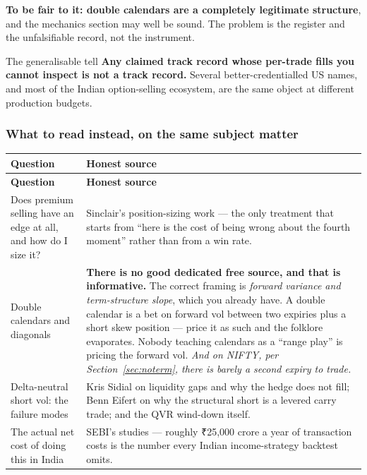 \documentclass[11pt,a4paper]{article}
\newcommand{\rs}{₹}
\begin{document}
\textbf{To be fair to it: double calendars are a completely legitimate structure},
and the mechanics section may well be sound. The problem is the register and the
unfalsifiable record, not the instrument.

\begin{keyfact}{The generalisable tell}
\textbf{Any claimed track record whose per-trade fills you cannot inspect is not a
track record.} Several better-credentialled US names, and most of the Indian
option-selling ecosystem, are the same object at different production budgets.
\end{keyfact}

\subsubsection{What to read instead, on the same subject matter}

{\small
\setlength{\LTpre}{8pt}\setlength{\LTpost}{8pt}
\begin{longtable}{@{}p{4.6cm}p{11.0cm}@{}}
\toprule
\textbf{Question} & \textbf{Honest source} \\
\midrule
\endfirsthead
\toprule
\textbf{Question} & \textbf{Honest source} \\
\midrule
\endhead
\bottomrule
\endlastfoot
Does premium selling have an edge at all, and how do I size it? &
Sinclair's position-sizing work --- the only treatment that starts from ``here is
the cost of being wrong about the fourth moment'' rather than from a win rate. \\[3pt]
Double calendars and diagonals &
\textbf{There is no good dedicated free source, and that is informative.} The
correct framing is \emph{forward variance and term-structure slope}, which you
already have. A double calendar is a bet on forward vol between two expiries plus
a short skew position --- price it as such and the folklore evaporates. Nobody
teaching calendars as a ``range play'' is pricing the forward vol. \emph{And on
NIFTY, per Section~\ref{sec:noterm}, there is barely a second expiry to trade.} \\[3pt]
Delta-neutral short vol: the failure modes &
Kris Sidial on liquidity gaps and why the hedge does not fill; Benn Eifert on why
the structural short is a levered carry trade; and the QVR wind-down itself. \\[3pt]
The actual net cost of doing this in India &
SEBI's studies --- roughly \rs 25{,}000 crore a year of transaction costs is the
number every Indian income-strategy backtest omits. \\
\end{longtable}
}
\end{document}
